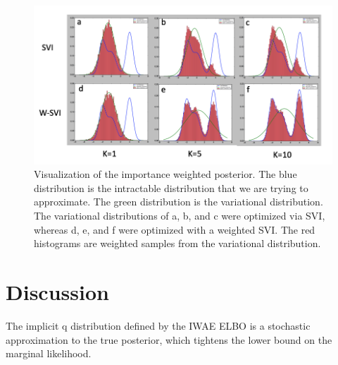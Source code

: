\documentclass{article}
\begin{document}
\begin{figure}[H]
  \centering
      \includegraphics[width=1.\textwidth]{posteriors.png}
  \caption{Visualization of the importance weighted posterior. The blue distribution is the intractable distribution that we are trying to approximate. The green distribution is the variational distribution. The variational distributions of a, b, and c were optimized via SVI, whereas d, e, and f were optimized with a weighted SVI. The red histograms are weighted samples from the variational distribution.}
  \label{viz}
\end{figure}


















\section{Discussion}
The implicit q distribution defined by the IWAE ELBO is a stochastic approximation to the true posterior, which tightens the lower bound on the marginal likelihood.





\end{document}
